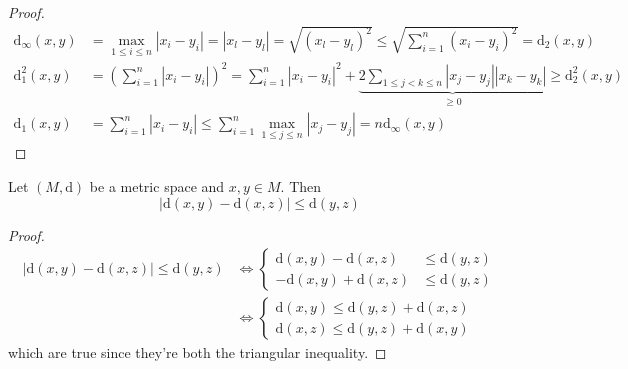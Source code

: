 \begin{proof}
	\begin{equation*}
		\begin{aligned}
			\mathrm{d}_\infty(x,y) &= \max_{1 \leq i \leq n}{|x_i - y_i|} = |x_l - y_l| = \sqrt{(x_l - y_l)^2} \leq \sqrt{\sum_{i=1}^n (x_i - y_i)^2} = \mathrm{d}_2(x,y) \\
			\mathrm{d}_1^2(x,y) &= \left( \sum_{i=1}^n |x_i - y_i| \right)^2 = \sum_{i=1}^n |x_i - y_i|^2 + \underbrace{2 \sum_{1 \leq j < k \leq n} |x_j - y_j| |x_k - y_k|}_{\geq 0} \geq \mathrm{d}_2^2(x,y) \\
			\mathrm{d}_1(x,y) &= \sum_{i=1}^n |x_i - y_i| \leq \sum_{i=1}^n \max_{1 \leq j \leq n} |x_j - y_j| = n \mathrm{d}_\infty(x,y)
		\end{aligned}
	\end{equation*}
\end{proof}

\begin{proposition}
	Let $(M,\mathrm{d})$ be a metric space and $x,y \in M$. Then
	\begin{equation*}
		|\mathrm{d}(x,y) - \mathrm{d}(x,z)| \leq \mathrm{d}(y,z)
	\end{equation*}
\end{proposition}

\begin{proof}
	\begin{equation*}
		\begin{aligned}
			|\mathrm{d}(x,y) - \mathrm{d}(x,z)| \leq \mathrm{d}(y,z) &\iff \begin{cases}
				\mathrm{d}(x,y) - \mathrm{d}(x,z) & \leq \mathrm{d}(y,z) \\
				-\mathrm{d}(x,y) + \mathrm{d}(x,z) & \leq \mathrm{d}(y,z) 
			\end{cases} \\
			&\iff \begin{cases}
				\mathrm{d}(x,y) \leq \mathrm{d}(y,z) + \mathrm{d}(x,z) \\
				\mathrm{d}(x,z) \leq \mathrm{d}(y,z) + \mathrm{d}(x,y)
			\end{cases}
		\end{aligned}
	\end{equation*}
	which are true since they're both the triangular inequality.
\end{proof}

